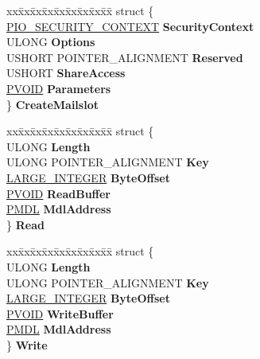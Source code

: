 \begin{DoxyCompactItemize}
\begin{tabbing}
\end{tabbing}\item 
\mbox{\label{union___f_l_t___p_a_r_a_m_e_t_e_r_s_aace52e0a0ab07b1ae4a4d86d3ef3b090}} 
\begin{tabbing}
xx\=xx\=xx\=xx\=xx\=xx\=xx\=xx\=xx\=\kill
struct \{\\
\>\hyperlink{struct___i_o___s_e_c_u_r_i_t_y___c_o_n_t_e_x_t}{PIO\_SECURITY\_CONTEXT} {\bfseries SecurityContext}\\
\>ULONG {\bfseries Options}\\
\>USHORT POINTER\_ALIGNMENT {\bfseries Reserved}\\
\>USHORT {\bfseries ShareAccess}\\
\>\hyperlink{interfacevoid}{PVOID} {\bfseries Parameters}\\
\} {\bfseries CreateMailslot}\\

\end{tabbing}\item 
\mbox{\label{union___f_l_t___p_a_r_a_m_e_t_e_r_s_a0fa054f8a61b837d5cf78af5855ddc92}} 
\begin{tabbing}
xx\=xx\=xx\=xx\=xx\=xx\=xx\=xx\=xx\=\kill
struct \{\\
\>ULONG {\bfseries Length}\\
\>ULONG POINTER\_ALIGNMENT {\bfseries Key}\\
\>\hyperlink{union___l_a_r_g_e___i_n_t_e_g_e_r}{LARGE\_INTEGER} {\bfseries ByteOffset}\\
\>\hyperlink{interfacevoid}{PVOID} {\bfseries ReadBuffer}\\
\>\hyperlink{interfacevoid}{PMDL} {\bfseries MdlAddress}\\
\} {\bfseries Read}\\

\end{tabbing}\item 
\mbox{\label{union___f_l_t___p_a_r_a_m_e_t_e_r_s_abfe48f7207197fd5630c84ea69a525cf}} 
\begin{tabbing}
xx\=xx\=xx\=xx\=xx\=xx\=xx\=xx\=xx\=\kill
struct \{\\
\>ULONG {\bfseries Length}\\
\>ULONG POINTER\_ALIGNMENT {\bfseries Key}\\
\>\hyperlink{union___l_a_r_g_e___i_n_t_e_g_e_r}{LARGE\_INTEGER} {\bfseries ByteOffset}\\
\>\hyperlink{interfacevoid}{PVOID} {\bfseries WriteBuffer}\\
\>\hyperlink{interfacevoid}{PMDL} {\bfseries MdlAddress}\\
\} {\bfseries Write}\\


\end{tabbing}
\end{DoxyCompactItemize}
